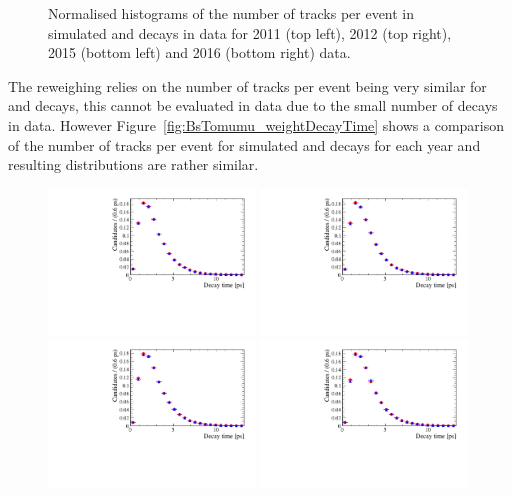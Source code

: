 \begin{figure}[htbp]
  \caption{Normalised histograms of the number of tracks per event in simulated \bdkpi and \bsmumu decays in data for 2011 (top left), 2012 (top right), 2015 (bottom left) and 2016 (bottom right) data. }
  \label{fig:BsmmVsBdToKpinTracks}
\end{figure}

The reweighing relies on the number of tracks per event being very similar for \bdkpi and \bsmumu decays, this cannot be evaluated in data due to the small number of \bsmumu decays in data. However Figure~\ref{fig:BsTomumu_weightDecayTime} shows a comparison of the number of tracks per event for simulated \bsmumu and \bdkpi decays for each year and resulting distributions are rather similar.
\begin{figure}[htbp]
  \centering
    \includegraphics[width=0.49\textwidth]{./Figs/LifetimeMeasurement/2011_DT_Bs2MuMu.pdf}
    \includegraphics[width=0.49\textwidth]{./Figs/LifetimeMeasurement/2012_DT_Bs2MuMu.pdf}
    \includegraphics[width=0.49\textwidth]{./Figs/LifetimeMeasurement/2015_DT_Bs2MuMu.pdf}
    \includegraphics[width=0.49\textwidth]{./Figs/LifetimeMeasurement/2016_DT_Bs2MuMu.pdf}

\end{figure}
